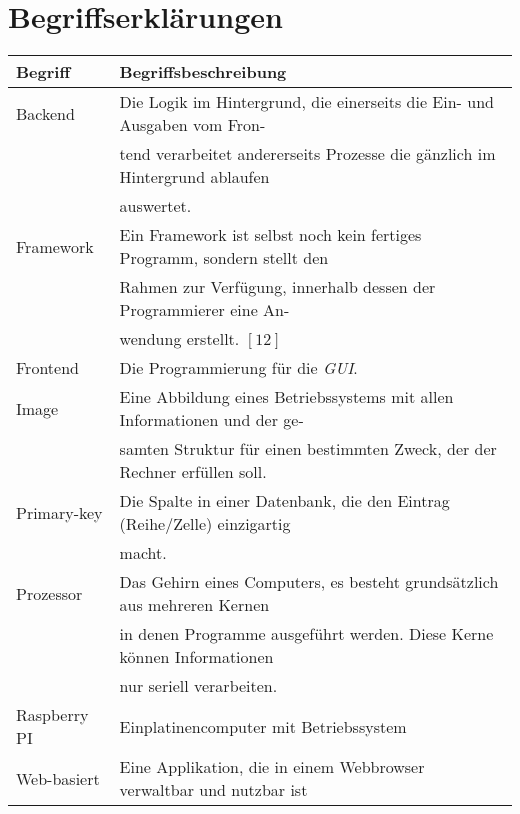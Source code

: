 \section*{Begriffserklärungen}
\begin{table}[H]
    \begin{tabular}{l|l}
         \textbf{Begriff}& \textbf{Begriffsbeschreibung}\\
         \hline
         Backend&               Die Logik im Hintergrund, die einerseits die Ein- und Ausgaben vom Fron-\\
         &                      tend verarbeitet andererseits Prozesse die gänzlich im Hintergrund ablaufen\\
         &                      auswertet.\\
         Framework&             Ein Framework ist selbst noch kein fertiges Programm, sondern stellt den\\
         &                      Rahmen zur Verfügung, innerhalb dessen der Programmierer eine An-\\
         &                      wendung erstellt. $[12]$\\
         Frontend&              Die Programmierung für die \textit{GUI}.\\
         Image&                 Eine Abbildung eines Betriebssystems mit allen Informationen und der ge-\\
         &                      samten Struktur für einen bestimmten Zweck, der der Rechner erfüllen soll.\\     
         Primary-key&           Die Spalte in einer Datenbank, die den Eintrag (Reihe/Zelle) einzigartig\\
         &                      macht.\\
         Prozessor&             Das Gehirn eines Computers, es besteht grundsätzlich aus mehreren Kernen\\
         &                      in denen Programme ausgeführt werden. Diese Kerne können Informationen\\
         &                      nur seriell verarbeiten.\\
         Raspberry PI&          Einplatinencomputer mit Betriebssystem\\
         Web-basiert&           Eine Applikation, die in einem Webbrowser verwaltbar und nutzbar ist\\
    \end{tabular}
    \label{tab:begriffserklaerungen}
\end{table}